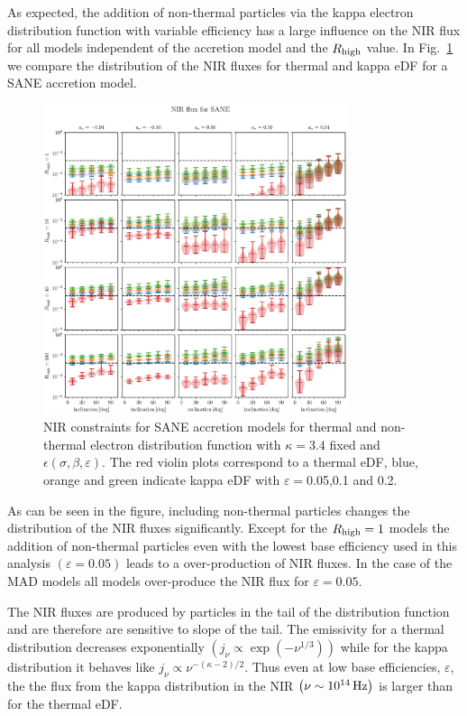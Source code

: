As expected, the addition of non-thermal particles via the kappa electron distribution function with variable efficiency has a large influence on the NIR flux for all models independent of the accretion model and the $R_\mathrm{high}$ value. In Fig.~\ref{fig:NIR_kappaepsilon} we compare the distribution of the NIR fluxes for thermal and kappa eDF for a SANE accretion model.

\begin{figure}
  \centering
  \includegraphics[width=0.8\textwidth]{./figures/SANE_NIR_standard.pdf}
  \caption{NIR constraints for SANE accretion models for thermal and non-thermal electron distribution function with $\kappa=3.4$ fixed and $\epsilon\left(\sigma,\beta,\varepsilon\right)$. The red violin plots correspond to a thermal eDF, blue, orange and green indicate kappa eDF with $\varepsilon=$0.05,0.1 and 0.2.}
  \label{fig:NIR_kappaepsilon}
\end{figure}

As can be seen in the figure, including non-thermal particles changes the distribution of the NIR fluxes significantly. Except for the $R_\mathrm{high}=1$ models the addition of non-thermal particles even with the lowest base efficiency used in this analysis $\left( \varepsilon=0.05\right)$ leads to a over-production of NIR fluxes. In the case of the MAD models all models over-produce the NIR flux for $\varepsilon=0.05$.

The NIR fluxes are produced by particles in the tail of the distribution function and are therefore are sensitive to slope of the tail. The emissivity for a thermal distribution decreases exponentially $\left(j_{\nu}\propto\exp(-\nu^{1/3})\right)$ while for the kappa distribution it behaves like $j_{\nu}\propto \nu^{-(\kappa-2)/2}$. Thus even at low base efficiencies, $\varepsilon$, the the flux from the kappa distribution in the NIR $\left(\nu\sim 10^{14}\,\rm{Hz}\right)$ is larger than for the thermal eDF.

